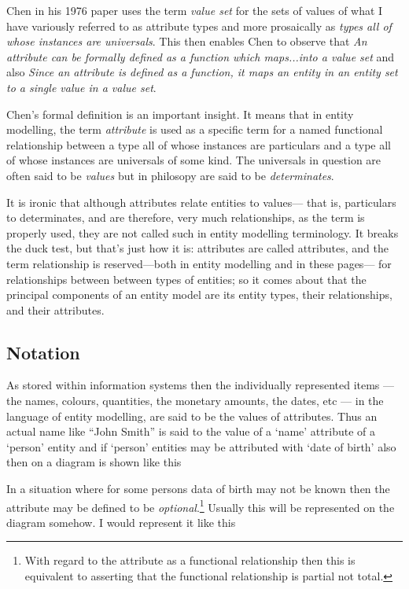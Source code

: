 \mynote
Chen in his  1976 paper uses the term \textit{value set} for the sets of values of what I have variously
referred to as attribute types and more prosaically as \textit{types all of whose instances are universals}.
This then enables Chen to observe that \textit{An attribute can be formally defined as a function which maps...into a value set} and also \textit{Since an attribute is defined as a function, it maps an entity in an entity
set to a single value in a value set}.

\mynote
Chen's formal definition is an important insight.
It means that in entity modelling, the term \textit{attribute} is used as a specific term
for a named functional relationship between a type all of whose instances are particulars  and a type all of whose instances are universals of some kind.
The universals in question are often said to be \textit{values} but 
in philosopy  are said to be \textit{determinates}. 

\mynote
It is ironic that although attributes relate entities to values—
that is, particulars to determinates, and are therefore, very much relationships, as the term is properly used, 
they are not called such in entity modelling terminology.
It breaks the duck test, but that’s just how it is:
attributes are called attributes,
and the term relationship is reserved---both in entity modelling and in these pages---
for relationships between between types of entities;
so it comes about that the principal components of an entity model are its entity types,
their relationships, and their attributes.

\subsection{Notation}
\mynote  As stored within information systems
then the individually represented items --- the 
names, colours, quantities, the monetary amounts, the dates, etc --- in the language 
of entity modelling, are said to be the values of attributes. Thus an actual name 
like ``John Smith'' is said to the value of a ‘name’ attribute of a ‘person’ entity and if 
`person' entities may be attributed with ‘date of birth’ also
then on a diagram is shown like this

\mynote 
In a situation where for some persons data of birth may not be known then the attribute
may be defined to be \textit{optional}.\footnote{With regard to the attribute as a functional relationship
then this is equivalent to asserting 
that the functional relationship is partial not total.}
Usually this will be represented on the diagram somehow. 
I would represent it like this

